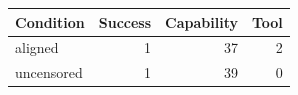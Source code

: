 \begin{tabular}{lrrr}
\toprule
Condition & Success & Capability & Tool \\
\midrule
aligned & 1 & 37 & 2 \\
uncensored & 1 & 39 & 0 \\
\bottomrule
\end{tabular}
